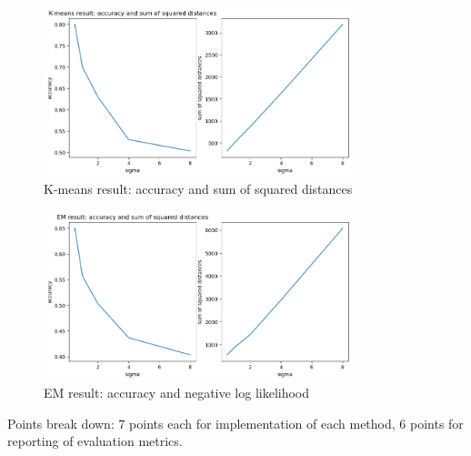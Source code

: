 \begin{itemize}
\begin{soln}
    \begin{figure}[h]
    \centering
    \includegraphics[width=0.8\textwidth]{Fig1.png}
    \caption{K-means result: accuracy and sum of squared distances}
    \label{fig:obj}
    \end{figure}
    \begin{figure}[h]
    \centering
    \includegraphics[width=0.8\textwidth]{Fig2.png}
    \caption{EM result: accuracy and negative log likelihood}
    \label{fig:obj}
    \end{figure}
\end{soln}

\end{itemize}

Points break down: 7 points each for implementation of each method, 6 points for reporting of
evaluation metrics.
